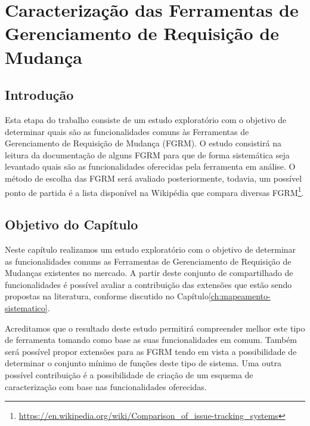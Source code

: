 \chapter{Caracterização das Ferramentas de Gerenciamento de Requisição de Mudança}
\label{ch:caracterizacao}


\section{Introdução}
Esta etapa do trabalho consiste de um estudo exploratório com o objetivo de determinar quais são as funcionalidades comuns às Ferramentas de Gerenciamento de Requisição de Mudança (FGRM). O estudo consistirá na leitura da documentação de alguns FGRM para que de forma sistemática seja levantado quais são as funcionalidades oferecidas pela ferramenta em análise. O método de escolha das FGRM será avaliado posteriormente, todavia, um possível ponto de partida é a lista disponível na Wikipédia que compara diversas FGRM\footnote{\url{https://en.wikipedia.org/wiki/Comparison_of_issue-tracking_systems}}.

\section{Objetivo do Capítulo}
\label{sec:objetivo_do_capítulo}

Neste capítulo realizamos um estudo exploratório com o objetivo de determinar as
funcionalidades comuns as Ferramentas de Gerenciamento de Requisição de Mudanças existentes no
mercado. A partir deste conjunto de compartilhado de funcionalidades é possível avaliar a
contribuição das extensões que estão sendo propostas na literatura, conforme discutido no
Capítulo\ref{ch:mapeamento-sistematico}.

Acreditamos que o resultado deste estudo permitirá compreender melhor este tipo de ferramenta tomando como base as
suas funcionalidades em comum. Também será possível propor extensões para as FGRM tendo em vista a
possibilidade de determinar o conjunto mínimo de funções deste tipo de sistema. Uma outra possível
contribuição é a possibilidade de criação de um esquema de caracterização com base nas funcionalidades oferecidas.

